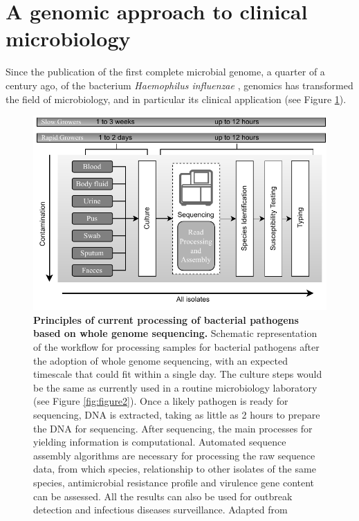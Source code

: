 \section{A genomic approach to clinical microbiology} \label{sec:_intro_genomics_approach}

Since the publication of the first complete microbial genome, a quarter of a century ago, of the bacterium \textit{Haemophilus influenzae} \citep{hood_dna_1996}, genomics has transformed the field of microbiology, and in particular its clinical application (see Figure \ref{fig:figure3}). 

\begin{figure}[h!]
\centering
\includegraphics[width=\textwidth]{figures/introduction/Figure 3.pdf}
\caption{\textbf{Principles of current processing of bacterial pathogens based on whole genome sequencing.} Schematic representation of the workflow for processing samples for bacterial pathogens after the adoption of whole genome sequencing, with an expected timescale that could fit within a single day. The culture steps would be the same as currently used in a routine microbiology laboratory (see Figure \ref{fig:figure2}). Once a likely pathogen is ready for sequencing, DNA is extracted, taking as little as 2 hours to prepare the DNA for sequencing.
After sequencing, the main processes for yielding information is computational. Automated sequence assembly algorithms are necessary for processing the raw sequence data, from which species, relationship to other isolates of the same species, antimicrobial resistance profile and virulence gene content can be assessed. All the results can also be used for outbreak detection and infectious diseases surveillance. Adapted from \cite{didelot_transforming_2012}}
\label{fig:figure3}
\end{figure}

